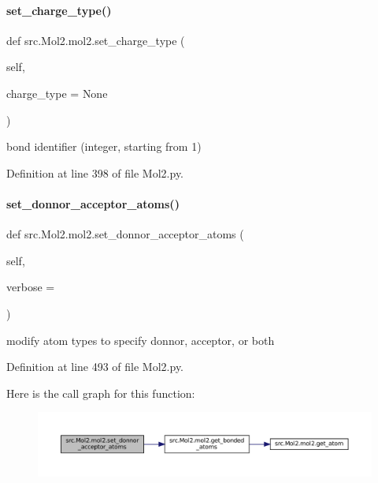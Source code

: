 \paragraph{\texorpdfstring{set\+\_\+charge\+\_\+type()}{set\_charge\_type()}}
{\footnotesize\ttfamily def src.\+Mol2.\+mol2.\+set\+\_\+charge\+\_\+type (\begin{DoxyParamCaption}\item[{}]{self,  }\item[{}]{charge\+\_\+type = {\ttfamily None} }\end{DoxyParamCaption})}



bond identifier (integer, starting from 1) 



Definition at line 398 of file Mol2.\+py.

\mbox{\label{classsrc_1_1Mol2_1_1mol2_ab5b30e2c2ee6ff7c9d05870341722dea}} 
\paragraph{\texorpdfstring{set\+\_\+donnor\+\_\+acceptor\+\_\+atoms()}{set\_donnor\_acceptor\_atoms()}}
{\footnotesize\ttfamily def src.\+Mol2.\+mol2.\+set\+\_\+donnor\+\_\+acceptor\+\_\+atoms (\begin{DoxyParamCaption}\item[{}]{self,  }\item[{}]{verbose = {} }\end{DoxyParamCaption})}



modify atom types to specify donnor, acceptor, or both 



Definition at line 493 of file Mol2.\+py.

Here is the call graph for this function\+:
\nopagebreak
\begin{figure}[H]
\begin{center}
\leavevmode
\includegraphics[width=350pt]{classsrc_1_1Mol2_1_1mol2_ab5b30e2c2ee6ff7c9d05870341722dea_cgraph}
\end{center}
\end{figure}
\mbox{\label{classsrc_1_1Mol2_1_1mol2_a51e365cc7be6edceb1d526396d28b1d1}} 
